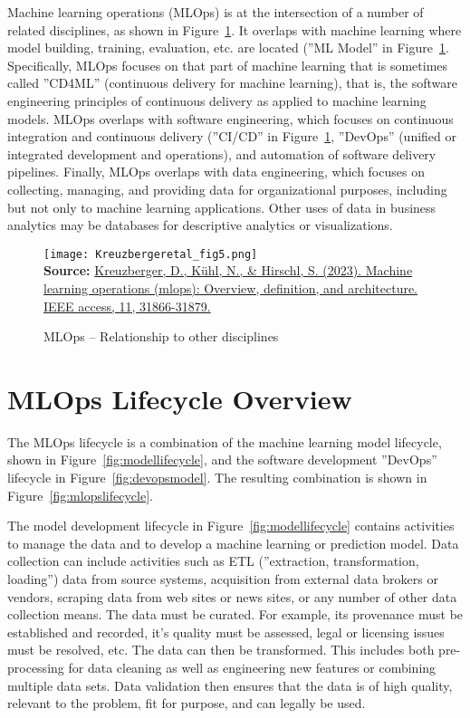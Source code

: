 Machine learning operations (MLOps) is at the intersection of a number of related disciplines, as shown in Figure~\ref{fig:mlopsrelationships}. It overlaps with machine learning where model building, training, evaluation, etc. are located (''ML Model'' in Figure~\ref{fig:mlopsrelationships}. Specifically, MLOps focuses on that part of machine learning that is sometimes called ''CD4ML'' (continuous delivery for machine learning), that is, the software engineering principles of continuous delivery as applied to machine learning models. MLOps overlaps with software engineering, which focuses on continuous integration and continuous delivery (''CI/CD'' in Figure~\ref{fig:mlopsrelationships}, ''DevOps'' (unified or integrated development and operations), and automation of software delivery pipelines. Finally, MLOps overlaps with data engineering, which focuses on collecting, managing, and providing data for organizational purposes, including but not only to machine learning applications. Other uses of data in business analytics may be databases for descriptive analytics or visualizations. 

\begin{figure}
\centering
\texttt{[image: Kreuzbergeretal\_fig5.png]} \\
\scriptsize \textbf{Source:} \href{https://ieeexplore.ieee.org/abstract/document/10081336}{Kreuzberger, D., K\"uhl, N., \& Hirschl, S. (2023). Machine learning operations (mlops): Overview, definition, and architecture. IEEE access, 11, 31866-31879.}
\caption{MLOps -- Relationship to other disciplines}
\label{fig:mlopsrelationships}
\end{figure}

\section{MLOps Lifecycle Overview}

The MLOps lifecycle is a combination of the machine learning model lifecycle, shown in Figure~\ref{fig:modellifecycle}, and the software development ''DevOps'' lifecycle in Figure~\ref{fig:devopsmodel}. The resulting combination is shown in Figure~\ref{fig:mlopslifecycle}. 

The model development lifecycle in Figure~\ref{fig:modellifecycle} contains activities to manage the data and to develop a machine learning or prediction model. Data collection can include activities such as ETL (''extraction, transformation, loading'') data from source systems, acquisition from external data brokers or vendors, scraping data from web sites or news sites, or any number of other data collection means. The data must be curated. For example, its provenance must be established and recorded, it's quality must be assessed, legal or licensing issues must be resolved, etc. The data can then be transformed. This includes both pre-processing for data cleaning as well as engineering new features or combining multiple data sets. Data validation then ensures that the data is of high quality, relevant to the problem, fit for purpose, and can legally be used. 

